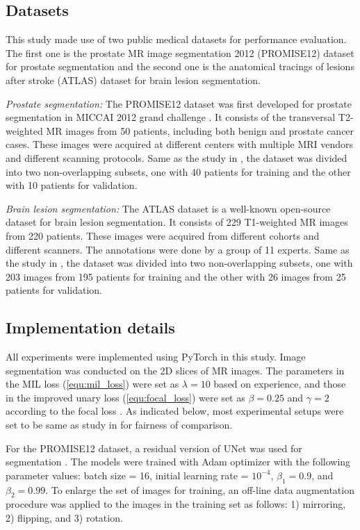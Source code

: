 \documentclass[runningheads]{llncs}
\begin{document}
\subsection{Datasets}
This study made use of two public medical datasets for performance evaluation. The first one is the prostate MR image segmentation 2012 (PROMISE12) dataset \cite{litjens2014evaluation} for prostate segmentation and the second one is the anatomical tracings of lesions after stroke (ATLAS) dataset \cite{liew2018large} for brain lesion segmentation. 



\textit{Prostate segmentation:} The PROMISE12 dataset was first developed for prostate segmentation in MICCAI 2012 grand challenge \cite{litjens2014evaluation}. It consists of the transversal T2-weighted MR images from 50 patients, including both benign and prostate cancer cases. These images were acquired at different centers with multiple MRI vendors and different scanning protocols. Same as the study in \cite{kervadec2020bounding}, the dataset was divided into two non-overlapping subsets, one with 40 patients for training and the other with 10 patients for validation. 


\textit{Brain lesion segmentation:} The ATLAS dataset is a well-known open-source dataset for brain lesion segmentation. It consists of 229 T1-weighted MR images from 220 patients. These images were acquired from different cohorts and different scanners. The annotations were done by a group of 11 experts. Same as the study in \cite{kervadec2020bounding}, the dataset was divided into two non-overlapping subsets, one with 203 images from 195 patients for training and the other with 26 images from 25 patients for validation. 


\subsection{Implementation details}
All experiments were implemented using PyTorch in this study. Image segmentation was conducted on the 2D slices of MR images. The parameters in the MIL loss (\ref{equ:mil_loss}) were set as $\lambda=10$ based on experience, and those in the improved unary loss (\ref{equ:focal_loss}) were set as $\beta=0.25$ and $\gamma=2$ according to the focal loss \cite{ross2017focal}. As indicated below, most experimental setups were set to be same as study in \cite{kervadec2020bounding} for fairness of comparison.

For the PROMISE12 dataset, a residual version of UNet \cite{ronneberger2015u} was used for segmentation \cite{kervadec2020bounding}. The models were trained with Adam optimizer \cite{kingma2014adam} with the following parameter values: batch size = 16, initial learning rate = $10^{-4}$, $\beta_1 = 0.9$, and $\beta_2 = 0.99$. To enlarge the set of images for training, an off-line data augmentation procedure \cite{kervadec2020bounding} was applied to the images in the training set as follows: 1) mirroring, 2) flipping, and 3) rotation.
\end{document}
